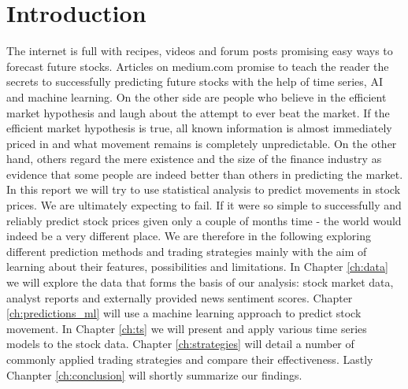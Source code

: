 \chapter{Introduction} \label{ch:Introduction}

The internet is full with recipes, videos and forum posts promising easy ways to forecast future stocks. Articles on medium.com promise to teach the reader the secrets to successfully predicting future stocks with the help of time series, AI and machine learning. On the other side are people who believe in the efficient market hypothesis and laugh about the attempt to ever beat the market. If the efficient market hypothesis is true, all known information is almost immediately priced in and what movement remains is completely unpredictable. On the other hand, others regard the mere existence and the size of the finance industry as evidence that some people are indeed better than others in predicting the market. In this report we will try to use statistical analysis to predict movements in stock prices. We are ultimately expecting to fail. If it were so simple to successfully and reliably predict stock prices given only a couple of months time - the world would indeed be a very different place. We are therefore in the following exploring different prediction methods and trading strategies mainly with the aim of learning about their features, possibilities and limitations. In Chapter \ref{ch:data} we will explore the data that forms the basis of our analysis: stock market data, analyst reports and externally provided news sentiment scores. Chapter \ref{ch:predictions_ml} will use a machine learning approach to predict stock movement. In Chapter \ref{ch:ts} we will present and apply various time series models to the stock data. Chapter \ref{ch:strategies} will detail a number of commonly applied trading strategies and compare their effectiveness. Lastly Chanpter \ref{ch:conclusion} will shortly summarize our findings. 







